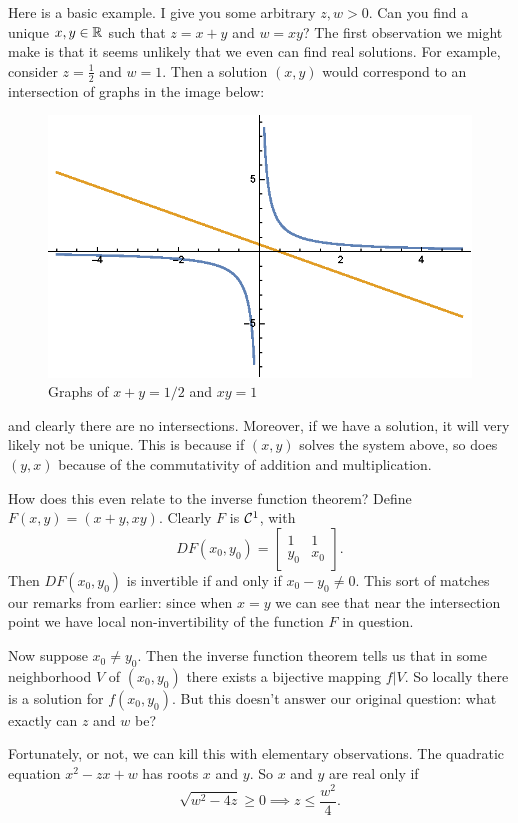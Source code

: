 Here is a basic example. I give you some arbitrary $z, w > 0$. Can you find a unique $x, y \in \mathbb{R}$ such that $z = x + y$ and $w = xy$? The first observation we might make is that it seems unlikely that we even can find real solutions. For example, consider $z = \frac{1}{2}$ and $w = 1$. Then a solution $(x, y)$ would correspond to an intersection of graphs in the image below:

\begin{figure}[h]
	\centering
	\includegraphics{plots_gr3.eps}
	\caption{Graphs of $x + y = 1/2$ and $xy = 1$}
	\label{fig:plots_gr3}
\end{figure}

and clearly there are no intersections. Moreover, if we have a solution, it will very likely not be unique. This is because if $(x, y)$ solves the system above, so does $(y, x)$ because of the commutativity of addition and multiplication.

How does this even relate to the inverse function theorem? Define $F(x, y) = (x + y, xy)$. Clearly $F$ is $\mathcal{C}^{1}$, with
\[DF(x_0, y_0) = \begin{bmatrix} 1 & 1 \\ y_0 & x_0\end{bmatrix}.\] Then $DF(x_0, y_0)$ is invertible if and only if $x_0 - y_0 \neq 0$. This sort of matches our remarks from earlier: since when $x = y$ we can see that near the intersection point we have local non-invertibility of the function $F$ in question.

Now suppose $x_0 \neq y_0$. Then the inverse function theorem tells us that in some neighborhood $V$ of $(x_0, y_0)$ there exists a bijective mapping $f|V$. So locally there is a solution for $f(x_0, y_0)$. But this doesn't answer our original question: what exactly can $z$ and $w$ be?

Fortunately, or not, we can kill this with elementary observations. The quadratic equation $x^2 -zx + w$ has roots $x$ and $y$. So $x$ and $y$ are real only if 
\[\sqrt{w^2 - 4z} \geq 0 \implies z \leq \frac{w^2}{4}.\]

